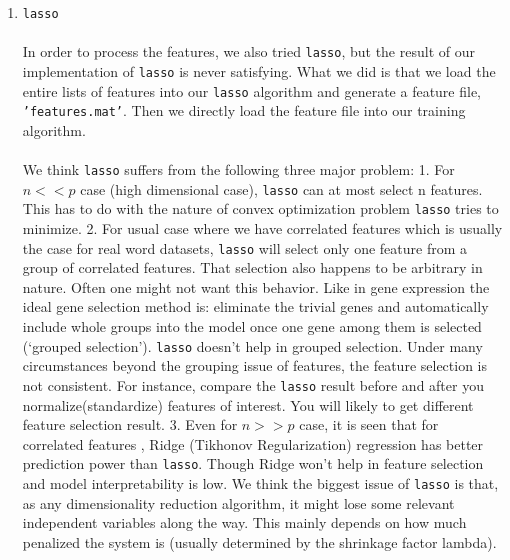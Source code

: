 \documentclass[english]{article}
\begin{document}
\begin{enumerate}
\begin{enumerate}
\begin{enumerate}
        \item \texttt{lasso}\\\\
        In order to process the features, we also tried \texttt{lasso}, but the result of our implementation of \texttt{lasso} is never satisfying. What we did is that we load the entire lists of features into our \texttt{lasso} algorithm and generate a feature file, \texttt{'features.mat'}. Then we directly load the feature file into our training algorithm.\\\\
        We think \texttt{lasso} suffers from the following three major problem: 1. For $n << p$ case (high dimensional case), \texttt{lasso} can at most select n features. This has to do with the nature of convex optimization problem \texttt{lasso} tries to minimize. 2. For usual case where we have correlated features which is usually the case for real word datasets, \texttt{lasso} will select only one feature from a group of correlated features. That selection also happens to be arbitrary in nature. Often one might not want this behavior. Like in gene expression the ideal gene selection method is: eliminate the trivial genes and automatically include whole groups into the model once one gene among them is selected (‘grouped selection’). \texttt{lasso} doesn't help in grouped selection. Under many circumstances beyond the grouping issue of features, the feature selection is not consistent. For instance, compare the \texttt{lasso} result before and after you normalize(standardize) features of interest. You will likely to get different feature selection result. 3. Even for $n >> p$ case, it is seen that for correlated features , Ridge (Tikhonov Regularization) regression has better prediction power than \texttt{lasso}. Though Ridge won't help in feature selection and model interpretability is low. We think the biggest issue of \texttt{lasso} is that, as any dimensionality reduction algorithm, it might lose some relevant independent variables along the way. This mainly depends on how much penalized the system is (usually determined by the shrinkage factor lambda). 
      \end{enumerate}
    \end{enumerate}
  \end{enumerate}
\end{document}
